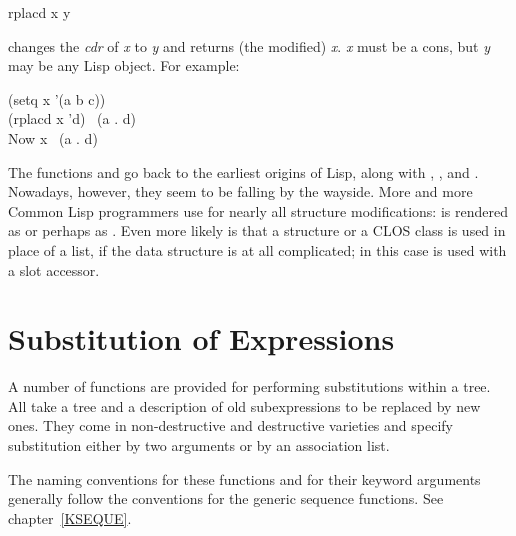 \begin{defun}[Function]
rplacd x y

 changes the \emph{cdr} of \emph{x} to \emph{y} and returns
(the modified) \emph{x}.  \emph{x} must be a cons, but \emph{y} may be
any Lisp object.
For example:
\begin{lisp}
(setq x '(a b c)) \\
(rplacd x 'd) \EV\ (a . d) \\
\textrm{Now} x \EV\ (a . d)
\end{lisp}
\end{defun}

The functions  and  go back to the earliest
origins of Lisp, along with , , and .
Nowadays, however, they seem to be falling by the wayside.
More and more Common Lisp programmers use  for nearly
all structure modifications:  is rendered
as  or perhaps as .
Even more likely is that a  structure or a CLOS class
is used in place of a list, if the data structure is at all complicated;
in this case  is used with a slot accessor.

\section{Substitution of Expressions}

A number of functions are provided for performing substitutions
within a tree.  All take a tree and a description
of old subexpressions to be replaced by new ones.
They come in non-destructive and destructive varieties
and specify substitution either by two arguments or by an association list.

The naming conventions for these functions and for their keyword
arguments generally follow the conventions for the generic sequence
functions.  See chapter~\ref{KSEQUE}.

